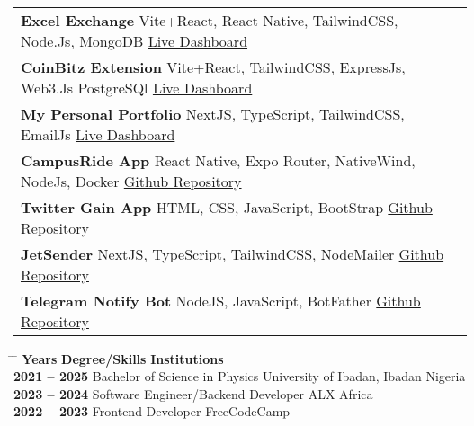 \documentclass{article}
\newcommand{\sectionnumber}[1]{\textbf{#1}}
\newcommand{\contactinfo}[1]{{\fontsize{11.5pt}{12pt}\selectfont #1}}
\newcommand{\sectiondivider}[2][0.4]{%
    \noindent
    \vspace{3pt}
    \textcolor{black}{%
        \noindent
        \makebox[\linewidth]{\rule{#1\linewidth}{0.5pt}%
        \hspace{5pt} \textbf{\uppercase{#2}} \hspace{5pt}%
        \rule{#1\linewidth}{0.5pt}}%
    }
    \vspace{3pt}
}
\begin{document}
\vspace{0.5cm}

\sectiondivider[0.46]{Projects} \\
\noindent
\begin{tabular}{p{} r}
    \sectionnumber{\large{Excel Exchange}} \textbar{} Vite+React, React Native, TailwindCSS, Node.Js, MongoDB \textbar{} \contactinfo{ \href{https://excelexchange.vercel.app}{Live Dashboard}} \\[0.4cm]
    \sectionnumber{\large{CoinBitz Extension}} \textbar{} Vite+React, TailwindCSS, ExpressJs, Web3.Js PostgreSQl \textbar{} \contactinfo{ \href{https://coinbit-extension.vercel.app}{Live Dashboard}} \\[0.4cm]
    \sectionnumber{\large{My Personal Portfolio}} \textbar{} NextJS, TypeScript, TailwindCSS, EmailJs \textbar{} \contactinfo{ \href{https://hadiademola.vercel.app}{Live Dashboard}} \\[0.4cm]
    \sectionnumber{\large{CampusRide App}} \textbar{} React Native, Expo Router, NativeWind, NodeJs, Docker \textbar{} \contactinfo{ \href{https://github.com/Hardeygold205/CampusRide}{Github Repository}} \\[0.4cm]
    \sectionnumber{\large{Twitter Gain App}} \textbar{} HTML, CSS, JavaScript, BootStrap \textbar{} \contactinfo{ \href{https://github.com/Hardeygold205/twitter-gain-app}{Github Repository}} \\[0.4cm]
    \sectionnumber{\large{JetSender}} \textbar{} NextJS, TypeScript, TailwindCSS, NodeMailer \textbar{} \contactinfo{ \href{https://github.com/Hardeygold205/BulkEMailSender}{Github Repository}} \\[0.4cm]
    \sectionnumber{\large{Telegram Notify Bot}} \textbar{} NodeJS, JavaScript, BotFather \textbar{} \contactinfo{ \href{https://github.com/Hardeygold205/NottifyBot}{Github Repository}} \\
\end{tabular}

\vspace{0.1cm}

\newpage
\sectiondivider[0.44]{Education}
\noindent
\begin{tabbing}
    \hspace{5cm} \= \hspace{8cm} \= \kill
    \textbf{Years} \> \textbf{Degree/Skills}  \> \textbf{Institutions} \\[0.3cm]
    \textbf{2021 -- 2025} \> Bachelor of Science in Physics  \> University of Ibadan, Ibadan Nigeria \\[0.2cm]
    \textbf{2023 -- 2024} \> Software Engineer/Backend Developer  \> ALX Africa \\[0.2cm]
    \textbf{2022 -- 2023} \> Frontend Developer  \> FreeCodeCamp \\
    
\end{tabbing}
\end{document}
